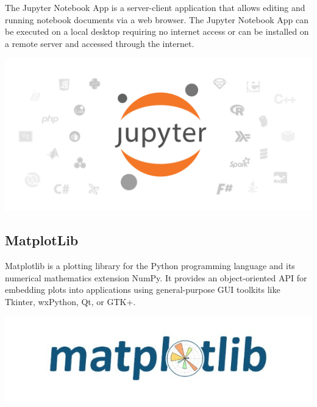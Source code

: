 \begin{minipage}{0.68\textwidth}
The Jupyter Notebook App is a server-client application that allows editing and running notebook documents via a web browser. The Jupyter Notebook App can be executed on a local desktop requiring no internet access or can be installed on a remote server and accessed through the internet.

\end{minipage}%
%
\begin{minipage}{0.3\textwidth}
  \hspace*{.4cm}
  \includegraphics[width=\textwidth]{images/jupyter_notebook}
\end{minipage}


\subsection{MatplotLib}

\begin{minipage}{0.68\textwidth}

Matplotlib is a plotting library for the Python programming language and its numerical mathematics extension NumPy. It provides an object-oriented API for embedding plots into applications using general-purpose GUI toolkits like Tkinter, wxPython, Qt, or GTK+.
\end{minipage}%
%
\begin{minipage}{0.3\textwidth}
  \hspace*{.4cm}
  \includegraphics[width=\textwidth]{images/matplot_lib}
\end{minipage}


